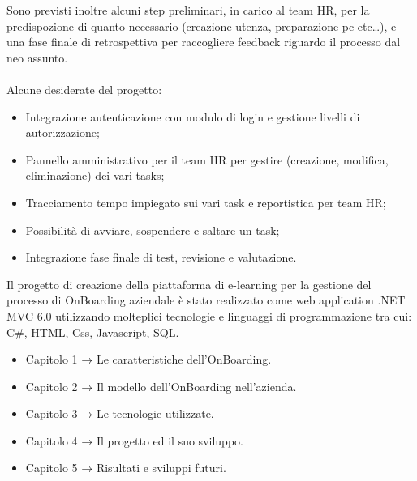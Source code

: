 Sono previsti inoltre alcuni step preliminari, in carico al team HR, per la predispozione di quanto 
necessario (creazione utenza, preparazione pc etc\dots), e una fase finale di 
retrospettiva per raccogliere feedback riguardo il processo dal neo assunto.\ 
\\ \\
Alcune desiderate del progetto:
\begin{itemize}
    \item Integrazione autenticazione con modulo di login e gestione livelli di autorizzazione;
    \item Pannello amministrativo per il team HR per gestire (creazione, modifica, eliminazione) dei vari tasks;
    \item Tracciamento tempo impiegato sui vari task e reportistica per team HR;\
    \item Possibilità di avviare, sospendere e saltare un task;
    \item Integrazione fase finale di test, revisione e valutazione.
\end{itemize}
Il progetto di creazione della piattaforma di e-learning per la gestione del processo di
OnBoarding aziendale è stato realizzato come web application .NET MVC 6.0
utilizzando molteplici tecnologie e linguaggi di programmazione tra cui: C\#, HTML, 
Css, Javascript, SQL.\
\\
\begin{itemize}
    \item Capitolo 1 → Le caratteristiche dell'OnBoarding. 
    \item Capitolo 2 → Il modello dell'OnBoarding nell'azienda.
    \item Capitolo 3 → Le tecnologie utilizzate.
    \item Capitolo 4 → Il progetto ed il suo sviluppo.
    \item Capitolo 5 → Risultati e sviluppi futuri.
\end{itemize}
